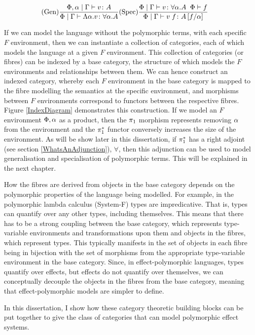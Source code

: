 \documentclass{Report}
\begin{document}
\begin{eqnarray}\label{PolymorphismTypeRules}
    (\text{Gen}) \frac{\Phi, \alpha\mid\Gamma \vdash v \colon A}{\Phi\mid\Gamma \vdash \Lambda \alpha. v \colon \forall \alpha. A}& (\text{Spec}) \frac{\Phi\mid\Gamma \vdash v \colon \forall \alpha. A\;\;\Phi\vdash f}{\Phi\mid\Gamma \vdash v\; f \colon A\left[f / \alpha\right]}
\end{eqnarray}

If we can model the language without the polymorphic terms, with each specific $F$ environment, then we can instantiate a collection of categories, each of which models the language at a given $F$ environment. This collection of categories (or fibres) can be indexed by a base category, the structure of which models the $F$ environments and relationships between them. We can hence construct an indexed category, whereby each $F$ environment in the base category is mapped to the fibre modelling the semantics at the specific environment, and morphisms between $F$ environments correspond to functors between the respective fibres. Figure \ref{IndexDiagram} demonstrates this construction. If we model an $F$ environment $\Phi, \alpha$ as a product, then the $\pi_1$ morphism represents removing $\alpha$ from the environment and the $\pi_1^*$ functor conversely increases the size of the environment. As will be show later in this dissertation, if $\pi_1^*$ has a right adjoint (see section \ref{WhatsAnAdjunction}), $\forall$, then this adjunction can be used to model generalisation and specialisation of polymorphic terms. This will be explained in the next chapter. 

How the fibres are derived from objects in the base category depends on the polymorphic properties of the language being modelled. For example, in the polymorphic lambda calculus (System-F) types are impredicative. That is, types can quantify over any other types, including themselves. This means that there has to be a strong coupling between the base category, which represents type-variable environments and transformations upon them and objects in the fibres, which represent types. This typically manifests in the set of objects  in each fibre being in bijection with the set of morphisms from the appropriate type-variable environment in the base category. Since, in effect-polymorphic languages, types quantify over effects, but effects do not quantify over themselves, we can conceptually decouple the objects in the fibres from the base category, meaning that effect-polymorphic models are simpler to define. 

In this dissertation, I show how these category theoretic building blocks can be put together to give the class of categories that can model polymorphic effect systems.
\end{document}
